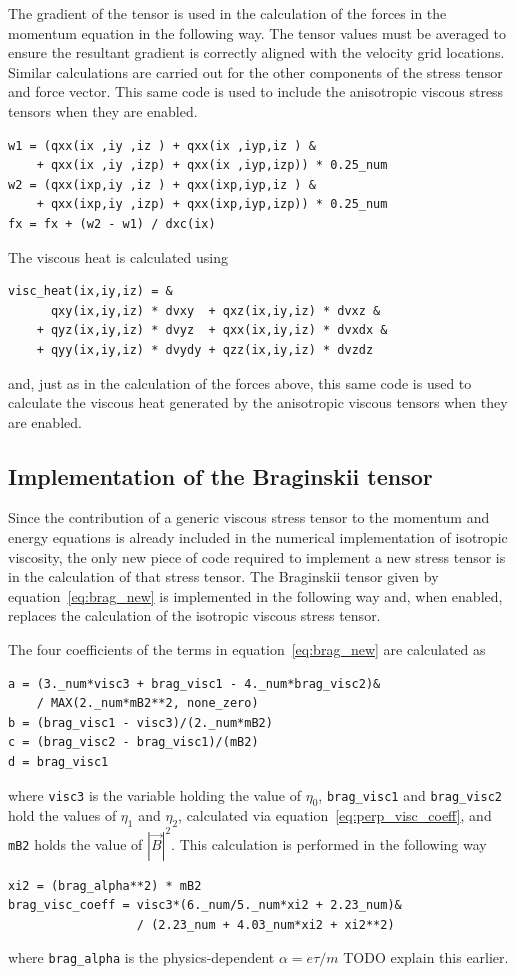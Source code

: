The gradient of the tensor is used in the calculation of the forces in the momentum equation in the following way. The tensor values must be averaged to ensure the resultant gradient is correctly aligned with the velocity grid locations. Similar calculations are carried out for the other components of the stress tensor and force vector. This same code is used to include the anisotropic viscous stress tensors when they are enabled.
\begin{verbatim}
w1 = (qxx(ix ,iy ,iz ) + qxx(ix ,iyp,iz ) &
    + qxx(ix ,iy ,izp) + qxx(ix ,iyp,izp)) * 0.25_num
w2 = (qxx(ixp,iy ,iz ) + qxx(ixp,iyp,iz ) &
    + qxx(ixp,iy ,izp) + qxx(ixp,iyp,izp)) * 0.25_num
fx = fx + (w2 - w1) / dxc(ix)
\end{verbatim}

The viscous heat is calculated using
\begin{verbatim}
visc_heat(ix,iy,iz) = &
      qxy(ix,iy,iz) * dvxy  + qxz(ix,iy,iz) * dvxz &
    + qyz(ix,iy,iz) * dvyz  + qxx(ix,iy,iz) * dvxdx &
    + qyy(ix,iy,iz) * dvydy + qzz(ix,iy,iz) * dvzdz
\end{verbatim}
and, just as in the calculation of the forces above, this same code is used to calculate the viscous heat generated by the anisotropic viscous tensors when they are enabled.

\subsection{Implementation of the Braginskii tensor}

Since the contribution of a generic viscous stress tensor to the momentum and energy equations is already included in the numerical implementation of isotropic viscosity, the only new piece of code required to implement a new stress tensor is in the calculation of that stress tensor. The Braginskii tensor given by equation~\ref{eq:brag_new} is implemented in the following way and, when enabled, replaces the calculation of the isotropic viscous stress tensor. 

The four coefficients of the terms in equation~\ref{eq:brag_new} are calculated as
\begin{verbatim}
a = (3._num*visc3 + brag_visc1 - 4._num*brag_visc2)&
    / MAX(2._num*mB2**2, none_zero)
b = (brag_visc1 - visc3)/(2._num*mB2)
c = (brag_visc2 - brag_visc1)/(mB2)
d = brag_visc1
\end{verbatim}
where \verb|visc3| is the variable holding the value of $\eta_0$, \verb|brag_visc1| and \verb|brag_visc2| hold the values of $\eta_1$ and $\eta_2$, calculated via equation~\ref{eq:perp_visc_coeff}, and \verb|mB2| holds the value of $|\vec{B}|^2$. This calculation is performed in the following way
\begin{verbatim}
xi2 = (brag_alpha**2) * mB2
brag_visc_coeff = visc3*(6._num/5._num*xi2 + 2.23_num)&
                  / (2.23_num + 4.03_num*xi2 + xi2**2)
\end{verbatim}
where \verb|brag_alpha| is the physics-dependent $\alpha = e \tau / m$ TODO explain this earlier.

